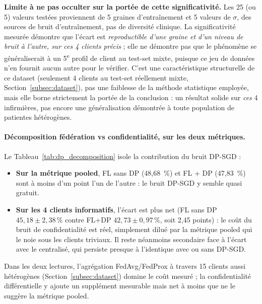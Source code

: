 \documentclass{article}
\begin{document}
\textbf{Limite à ne pas occulter sur la portée de cette significativité.} Les 25 (ou 5)
valeurs testées proviennent de 5 graines d'entraînement et 5 valeurs de $\sigma$, des
sources de bruit d'entraînement, pas de diversité clinique. La significativité mesurée
démontre que l'écart est \emph{reproductible d'une graine et d'un niveau de bruit à
l'autre, sur ces 4 clients précis} ; elle ne démontre pas que le phénomène se
généraliserait à un 5\textsuperscript{e} profil de client au test-set mixte, puisque ce
jeu de données n'en fournit aucun autre pour le vérifier. C'est une caractéristique
structurelle de ce dataset (seulement 4 clients au test-set réellement mixte,
Section~\ref{subsec:dataset}), pas une faiblesse de la méthode statistique employée,
mais elle borne strictement la portée de la conclusion : un résultat solide sur
\emph{ces} 4 infirmières, pas encore une généralisation démontrée à toute population de
patientes hétérogènes.

\paragraph{Décomposition fédération vs confidentialité, sur les deux métriques.}
Le Tableau~\ref{tab:dp_decomposition} isole la contribution du bruit DP-SGD :
\begin{itemize}
  \item \textbf{Sur la métrique pooled}, FL sans DP (48,68~\%) et FL + DP (47,83~\%)
  sont à moins d'un point l'un de l'autre : le bruit DP-SGD y semble quasi gratuit.
  \item \textbf{Sur les 4 clients informatifs}, l'écart est plus net (FL sans DP
  $45{,}18 \pm 2{,}38\,\%$ contre FL+DP $42{,}73 \pm 0{,}97\,\%$, soit 2,45 points) :
  le coût du bruit de confidentialité est réel, simplement dilué par la métrique
  pooled qui le noie sous les clients triviaux. Il reste néanmoins secondaire face à
  l'écart avec le centralisé, qui persiste presque à l'identique avec ou sans DP-SGD.
\end{itemize}
Dans les deux lectures, l'agrégation FedAvg/FedProx à travers 15 clients aussi
hétérogènes (Section~\ref{subsec:dataset}) domine le coût mesuré ; la confidentialité
différentielle y ajoute un supplément mesurable mais net à moins que ne le suggère la
métrique pooled.
\end{document}
